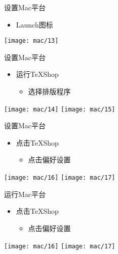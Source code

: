 \documentclass[fontset = none, t]{ctexbeamer}
\begin{document}
\begin{frame}{设置\tl}{Mac平台}
  \begin{itemize}
  \item Launch图标
  \end{itemize}
  \centering
  \vfill
  \texttt{[image: mac/13]}
  \vfill
\end{frame}

\begin{frame}{设置\tl}{Mac平台}
  \begin{itemize}
  \item 运行TeXShop
    \begin{itemize}
        \item 选择排版程序
     \end{itemize}
  \end{itemize}
  \begin{center}    
    \texttt{[image: mac/14]}
    \texttt{[image: mac/15]}
  \end{center}
\end{frame}

\begin{frame}{设置\tl}{Mac平台}
  \begin{itemize}
  \item 点击TeXShop
    \begin{itemize}
        \item 点击偏好设置
     \end{itemize}
  \end{itemize}
  \begin{center}    
    \texttt{[image: mac/16]}
    \texttt{[image: mac/17]}
  \end{center}
\end{frame}

\begin{frame}{运行\tl}{Mac平台}
  \begin{itemize}
  \item 点击TeXShop
    \begin{itemize}
        \item 点击偏好设置
     \end{itemize}
  \end{itemize}
  \begin{center}    
    \texttt{[image: mac/16]}
    \texttt{[image: mac/17]}
  \end{center}
\end{frame}
\end{document}
